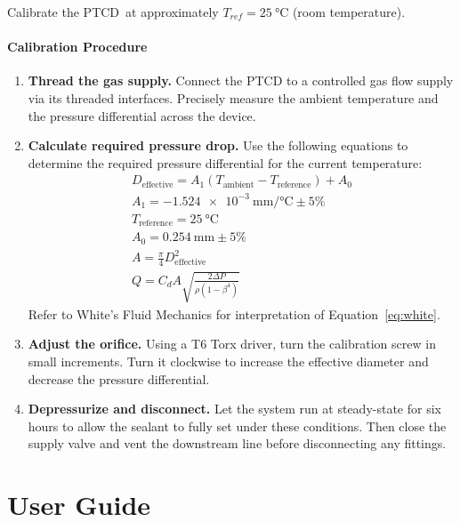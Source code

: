 \documentclass[12pt, letterpaper]{report}%
\newcounter{mycounter}           %
\newcounter{sub}[mycounter]      %
\newcommand{\device}{PTCD}
\newcommand{\Tref}{\SI{25}{\degreeCelsius}} %
\newcommand{\AoneExact}{\SI{-1.524e-3}{\milli\meter\per\celsius}}
\newcommand{\Aone}{\AoneExact \pm 5\%}
\newcommand{\AzeroExact}{\SI{0.254}{\milli\meter}}
\newcommand{\Azero}{\AzeroExact \pm 5\%}
\begin{document}
\begin{appendices}
	Calibrate the \device\ at approximately $T_{ref} = \Tref$ (room temperature).

	\subsubsection{Calibration Procedure}

	\begin{enumerate}[itemsep=5pt]
		\item \textbf{Thread the gas supply.} Connect the PTCD to a controlled gas flow
					supply via its threaded interfaces. Precisely measure the ambient temperature
					and the pressure differential across the device.
		\item \textbf{Calculate required pressure drop.} Use the following equations to determine
					the required pressure differential for the current temperature:
					\begin{align}
						D_{\text{effective}} = A_1 (T_{\text{ambient}} - T_{\text{reference}}) + A_0 \\
						A_1 = \Aone \\
						T_{\text{reference}} = \SI{25}{\degreeCelsius} \\
						A_0 = \Azero \\
						A = \frac{\pi}{4} D_{\text{effective}}^2 \\
						Q = C_d A \sqrt{\frac{2 \Delta P}{\rho (1 - \beta^4)}} \label{eq:white}
					\end{align}
					Refer to White's Fluid Mechanics\cite[Eq.~6-102]{ref_white} for interpretation of
					Equation~\eqref{eq:white}.
		\item \textbf{Adjust the orifice.} Using a T6 Torx driver, turn the calibration
					screw in small increments. Turn it clockwise to increase the effective
					diameter and decrease the pressure differential.
		\item \textbf{Depressurize and disconnect.} Let the system run at steady-state for six hours
					to allow the sealant to fully set under these conditions. Then close the supply valve and vent
					the downstream line before disconnecting any fittings.
	\end{enumerate}

	\setcounter{section}{1}
	\renewcommand{\thesection}{\thechapter.\arabic{section}}

	\chapter*{User Guide}
	\label{app:op}
	\setcounter{section}{0}
	\renewcommand{\thesection}{\arabic{section}}



\end{appendices}
\end{document}
